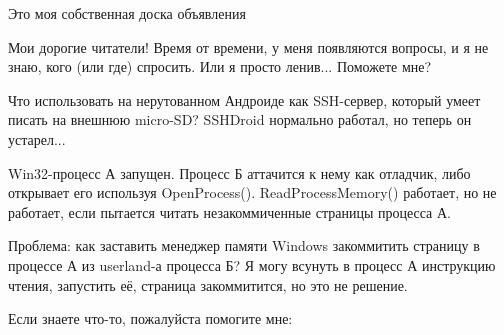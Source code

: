 
\begin{center}
\LARGE{} Это моя собственная доска объявления \normalsize{}
\end{center}

Мои дорогие читатели! Время от времени, у меня появляются вопросы, и я не знаю, кого (или где) спросить.
Или я просто ленив...
Поможете мне?

\myhrule{}

Что использовать на нерутованном Андроиде как SSH-сервер, который умеет писать на внешнюю micro-SD?
SSHDroid нормально работал, но теперь он устарел...

\myhrule{}

Win32-процесс А запущен.
Процесс Б аттачится к нему как отладчик, либо открывает его используя OpenProcess().
ReadProcessMemory() работает, но не работает, если пытается читать незакоммиченные страницы процесса А.

Проблема: как заставить менеджер памяти Windows закоммитить страницу в процессе А из userland-а процесса Б?
Я могу всунуть в процесс А инструкцию чтения, запустить её, страница закоммитится, но это не решение.

\myhrule{}

Если знаете что-то, пожалуйста помогите мне: \EMAIL{}

